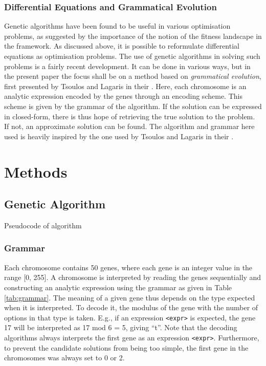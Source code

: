 \documentclass[multicolumn, 12pt]{extarticle}
\begin{document}
\subsubsection{Differential Equations and Grammatical Evolution}
Genetic algorithms have been found to be useful in various optimisation problems, as suggested by the importance of the notion of the fitness landscape in the framework. As discussed above, it is possible to reformulate differential equations as optimisation problems. The use of genetic algorithms in solving such problems is a fairly recent development. It can be done in various ways, but in the present paper the focus shall be on a method based on \textit{grammatical evolution}, first presented by Tsoulos and Lagaris in their  \cite{Lagaris}. Here, each chromosome is an analytic expression encoded by the genes through an encoding scheme. This scheme is given by the grammar of the algorithm. If the solution can be expressed in closed-form, there is thus hope of retrieving the true solution to the problem. If not, an approximate solution can be found. The algorithm and grammar here used is heavily inspired by the one used by Tsoulos and Lagaris in their  \cite{Lagaris}. 



\section{Methods}

\subsection{Genetic Algorithm}

Pseudocode of algorithm 

\subsubsection{Grammar}
Each chromosome contains 50 genes, where each gene is an integer value in the range [0, 255]. A chromosome is interpreted by reading the genes sequentially and constructing an analytic expression using the grammar as given in Table \ref{tab:grammar}.  The meaning of a given gene thus depends on the type expected when it is interpreted. To decode it, the modulus of the gene with the number of options in that type is taken. E.g., if an expression \texttt{<expr>} is expected, the gene 17 will be interpreted as 17 mod 6 = 5, giving ``t''. Note that the decoding algorithms always interprets the first gene as an expression \texttt{<expr>}.  Furthermore, to prevent the candidate solutions from being too simple, the first gene in the chromosomes was always set to 0 or 2. 
\end{document}
